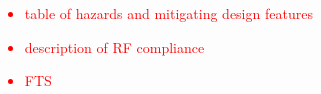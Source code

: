 \textcolor{red}{
\begin{itemize}
	\item
		table of hazards and mitigating design features
	\item
		description of RF compliance
	\item
		FTS
\end{itemize}
}

